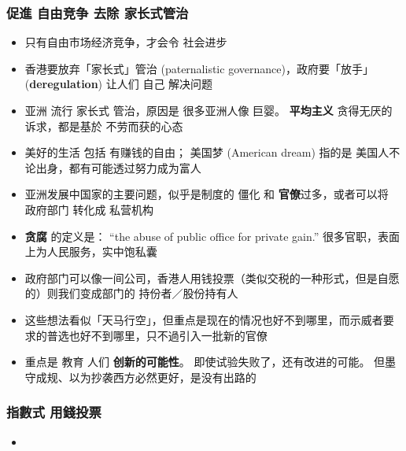 \documentclass[10pt]{beamer}
\newcommand{\emp}[1]{{\color{blue}\textbf{#1}}}
\begin{document}
\begin{frame}
\frametitle{促進 自由竞争 \textbullet 去除 家长式管治}
\begin{itemize}
	\item 只有自由市场经济竞争，才会令 社会进步
	
	\item 香港要放弃「家长式」管治 (paternalistic governance)，政府要「放手」(\emp{deregulation}) 让人们 自己 解决问题
	
	\item 亚洲 流行 家长式 管治，原因是 很多亚洲人像 巨婴。 \emp{平均主义} 贪得无厌的诉求，都是基於 不劳而获的心态
	
	\item 美好的生活 包括 有赚钱的自由； 美国梦 (American dream) 指的是 美国人不论出身，都有可能透过努力成为富人
	
	\item 亚洲发展中国家的主要问题，似乎是制度的 僵化 和 \emp{官僚}过多，或者可以将 政府部门 转化成 私营机构
	
	\item \emp{贪腐} 的定义是： ``the abuse of public office for private gain.''  很多官职，表面上为人民服务，实中饱私囊

	\item 政府部门可以像一间公司，香港人用钱投票（类似交税的一种形式，但是自愿的）则我们变成部门的 持份者／股份持有人
	
	\item 这些想法看似「天马行空」，但重点是现在的情况也好不到哪里，而示威者要求的普选也好不到哪里，只不過引入一批新的官僚
	
	\item 重点是 教育 人们 \emp{创新的可能性}。 即使试验失败了，还有改进的可能。 但墨守成规、以为抄袭西方必然更好，是没有出路的

\end{itemize}
\end{frame}

\begin{frame}
\frametitle{指數式 用錢投票}
\begin{itemize}
	\item 

\end{itemize}
\end{frame}
\end{document}
